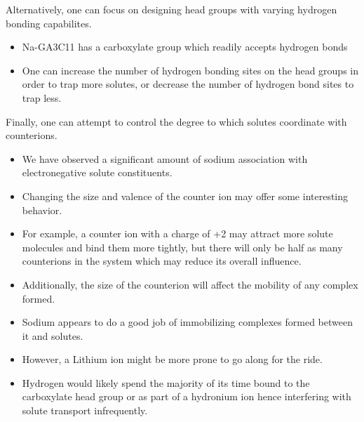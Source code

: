 \documentclass{article}
\begin{document}
  Alternatively, one can focus on designing head groups with varying hydrogen 
  bonding capabilites.
  \begin{itemize}
    \item Na-GA3C11 has a carboxylate group which readily accepts hydrogen bonds
    \item One can increase the number of hydrogen bonding sites on the head groups
    in order to trap more solutes, or decrease the number of hydrogen bond sites
    to trap less.
  \end{itemize}
  
  Finally, one can attempt to control the degree to which solutes coordinate 
  with counterions.
  \begin{itemize}
    \item We have observed a significant amount of sodium association with 
    electronegative solute constituents.
    \item Changing the size and valence of the counter ion may offer some
    interesting behavior. 
    \item For example, a counter ion with a charge of +2 may attract more solute
    molecules and bind them more tightly, but there will only be half as many
    counterions in the system which may reduce its overall influence.
    \item Additionally, the size of the counterion will affect the mobility
    of any complex formed. 
    \item Sodium appears to do a good job of immobilizing complexes formed between
    it and solutes. 
    \item However, a Lithium ion might be more prone to go along for the ride.
    \item Hydrogen would likely spend the majority of its time bound to the 
    carboxylate head group or as part of a hydronium ion hence interfering with 
    solute transport infrequently.
  \end{itemize}
  
  
\end{document}
